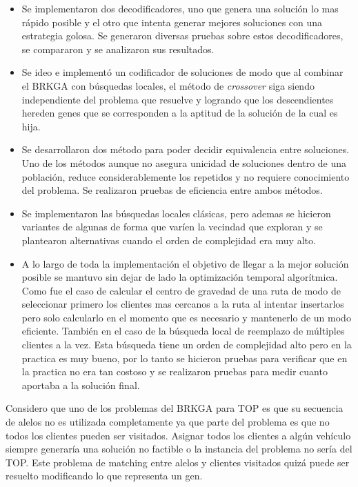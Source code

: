 \begin{itemize}
	\item Se implementaron dos decodificadores, uno que genera una solución lo mas rápido posible y el otro que intenta generar mejores soluciones con una estrategia golosa. Se generaron diversas pruebas sobre estos decodificadores, se compararon y se analizaron sus resultados. 
	\item Se ideo e implementó un codificador de soluciones de modo que al combinar el BRKGA con búsquedas locales, el método de \textit{crossover} siga siendo independiente del problema que resuelve y logrando que los descendientes hereden genes que se corresponden a la aptitud de la solución de la cual es hija. 
	\item Se desarrollaron dos método para poder decidir equivalencia entre soluciones. Uno de los métodos aunque no asegura unicidad de soluciones dentro de una población, reduce considerablemente los repetidos y no requiere conocimiento del problema. Se realizaron pruebas de eficiencia entre ambos métodos.
	\item Se implementaron las búsquedas locales clásicas, pero ademas se hicieron variantes de algunas de forma que varíen la vecindad que exploran y se plantearon alternativas cuando el orden de complejidad era muy alto.
	\item A lo largo de toda la implementación el objetivo de llegar a la mejor solución posible se mantuvo sin dejar de lado la optimización temporal algorítmica. Como fue el caso de calcular el centro de gravedad de una ruta de modo de seleccionar primero los clientes mas cercanos a la ruta al intentar insertarlos pero solo calcularlo en el momento que es necesario y mantenerlo de un modo eficiente. También en el caso de la búsqueda local de reemplazo de múltiples clientes a la vez. Esta búsqueda tiene un orden de complejidad alto pero en la practica es muy bueno, por lo tanto se hicieron pruebas para verificar que en la practica no era tan costoso y se realizaron pruebas para medir cuanto aportaba a la solución final.
\end{itemize}

\bigskip

Considero que uno de los problemas del BRKGA para TOP es que su secuencia de alelos no es utilizada completamente ya que parte del problema es que no todos los clientes pueden ser visitados. Asignar todos los clientes a algún vehículo siempre generaría una solución no factible o la instancia del problema no sería del TOP. Este problema de matching entre alelos y clientes visitados quizá puede ser resuelto modificando lo que representa un gen. 

